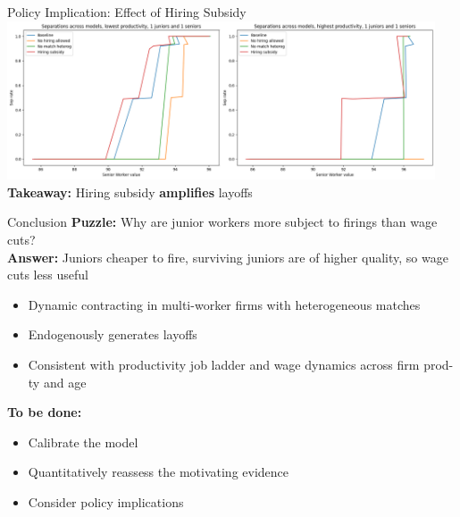 \documentclass[9pt,aspectratio=169]{beamer} %
\begin{document}
\begin{frame}{Policy Implication: Effect of Hiring Subsidy}
\includegraphics[width=0.95\textwidth]{Separations hiring sub.png}
\textbf{Takeaway:} Hiring subsidy \textbf{amplifies} layoffs
\end{frame}

\begin{frame}{Conclusion}
\textbf{Puzzle:} Why are junior workers more subject to firings than wage cuts? \\
\bigskip
\textbf{Answer:} Juniors cheaper to fire, surviving juniors are of higher quality, so wage cuts less useful
\begin{itemize}
    \item Dynamic contracting in multi-worker firms with heterogeneous matches
    \item Endogenously generates layoffs
    \item Consistent with productivity job ladder and wage dynamics across firm prod-ty and age
\end{itemize}
\bigskip
\textbf{To be done:}
\begin{itemize}
    \item Calibrate the model
    \smallskip
    \item Quantitatively reassess the motivating evidence
    \smallskip
    \item Consider policy implications
\end{itemize}
\end{frame}
\end{document}

